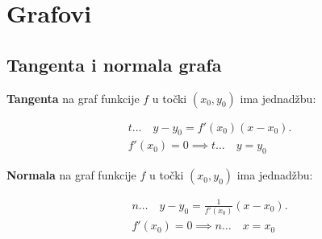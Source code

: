 \section{Grafovi}
\subsection{Tangenta i normala grafa}

\textbf{Tangenta} na graf funkcije $f$ u točki $(x_0,y_0)$ ima jednadžbu:

\begin{gather*}
t\dots\quad y-y_0=f'(x_0)(x-x_0).\\
f'(x_0)=0\implies t\dots\quad y = y_0
\end{gather*}

\noindent
\textbf{Normala} na graf funkcije $f$ u točki $(x_0,y_0)$ ima jednadžbu:

\begin{gather*}
n\dots\quad y-y_0=\frac{1}{f'(x_0)}(x-x_0).\\
f'(x_0)=0\implies n\dots\quad x = x_0
\end{gather*}
